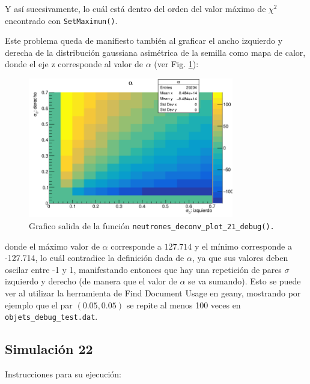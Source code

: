 \documentclass[11pt,letterpaper]{article}
\begin{document}
Y así sucesivamente, lo cuál está dentro del orden del valor máximo de $\chi^2$ encontrado con  \verb|SetMaximun()|.

Este problema queda de manifiesto también al graficar el ancho izquierdo y derecha de la distribución gaussiana asimétrica de la semilla como mapa de calor, donde el eje z corresponde al valor de $\alpha$ (ver Fig. \ref{neutrones_deconv_plot_21_debug}):

\begin{figure}[H]
    \includegraphics[width=0.8\textwidth]{img/sigma_izq_vs_der_alphaz.png}
    \centering
     \cprotect\caption{Grafico salida de la función \verb|neutrones_deconv_plot_21_debug().|} 
\label{neutrones_deconv_plot_21_debug}
\end{figure}

donde el máximo valor de $\alpha$ corresponde a $127.714$ y el mínimo corresponde a -127.714, lo cuál contradice la definición dada de $\alpha$, ya que sus valores deben oscilar entre -1 y 1, manifestando entonces que hay una repetición de pares $\sigma$ izquierdo y derecho (de manera que el valor de $\alpha$ se va sumando). Esto se puede ver al utilizar la herramienta de Find Document Usage en geany, mostrando por ejemplo que el par $(0.05,0.05)$ se repite al menos 100 veces en \verb|objets_debug_test.dat|.

\subsection*{Simulación 22}

Instrucciones para su ejecución:
\end{document}
